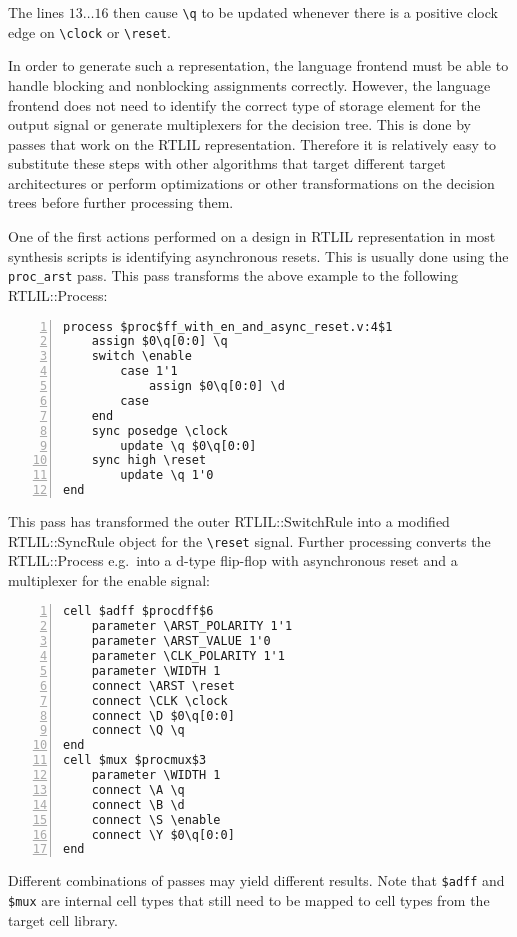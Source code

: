 The lines $13 \dots 16$  then cause {\tt \textbackslash{}q} to be updated whenever there is
a positive clock edge on {\tt \textbackslash{}clock} or {\tt \textbackslash{}reset}.

In order to generate such a representation, the language frontend must be able to handle blocking
and nonblocking assignments correctly. However, the language frontend does not need to identify
the correct type of storage element for the output signal or generate multiplexers for the
decision tree. This is done by passes that work on the RTLIL representation. Therefore it is
relatively easy to substitute these steps with other algorithms that target different target
architectures or perform optimizations or other transformations on the decision trees before
further processing them.

One of the first actions performed on a design in RTLIL representation in most
synthesis scripts is identifying asynchronous resets. This is usually done using the {\tt proc\_arst}
pass. This pass transforms the above example to the following RTLIL::Process:

\begin{lstlisting}[numbers=left,frame=single,language=rtlil]
process $proc$ff_with_en_and_async_reset.v:4$1
	assign $0\q[0:0] \q
	switch \enable
		case 1'1
			assign $0\q[0:0] \d
		case 
	end
	sync posedge \clock
		update \q $0\q[0:0]
	sync high \reset
		update \q 1'0
end
\end{lstlisting}

This pass has transformed the outer RTLIL::SwitchRule into a modified RTLIL::SyncRule object
for the {\tt \textbackslash{}reset} signal. Further processing converts the RTLIL::Process
e.g.~into a d-type flip-flop with asynchronous reset and a multiplexer for the enable signal:

\begin{lstlisting}[numbers=left,frame=single,language=rtlil]
cell $adff $procdff$6
	parameter \ARST_POLARITY 1'1
	parameter \ARST_VALUE 1'0
	parameter \CLK_POLARITY 1'1
	parameter \WIDTH 1
	connect \ARST \reset
	connect \CLK \clock
	connect \D $0\q[0:0]
	connect \Q \q
end
cell $mux $procmux$3
	parameter \WIDTH 1
	connect \A \q
	connect \B \d
	connect \S \enable
	connect \Y $0\q[0:0]
end
\end{lstlisting}

Different combinations of passes may yield different results. Note that {\tt \$adff} and {\tt
\$mux} are internal cell types that still need to be mapped to cell types from the
target cell library.

